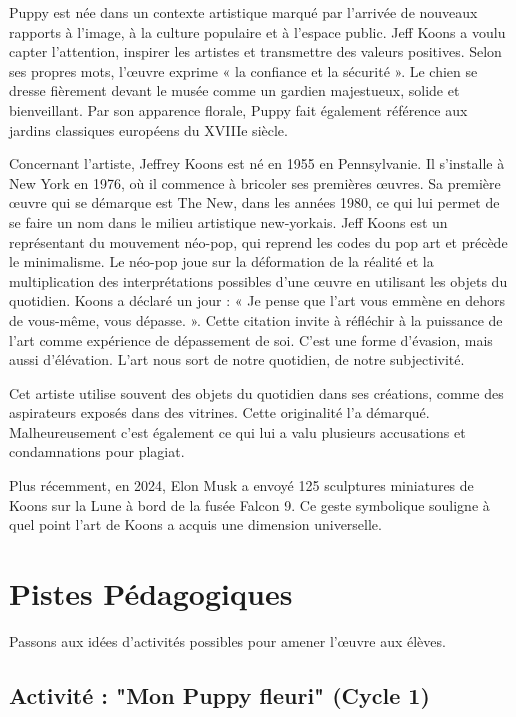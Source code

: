 \documentclass[12pt]{article}
\begin{document}
Puppy est née dans un contexte artistique marqué par l’arrivée de nouveaux rapports à l’image, à la culture populaire et à l’espace public.
Jeff Koons a voulu capter l’attention, inspirer les artistes et transmettre des valeurs positives. Selon ses propres mots, l’œuvre exprime « la confiance et la sécurité ». Le chien se dresse fièrement devant le musée comme un gardien majestueux, solide et bienveillant. Par son apparence florale, Puppy fait également référence aux jardins classiques européens du XVIIIe siècle.

Concernant l’artiste, Jeffrey Koons est né en 1955 en Pennsylvanie. Il s’installe à New York en 1976, où il commence à bricoler ses premières œuvres. Sa première œuvre qui se démarque est The New, dans les années 1980, ce qui lui permet de se faire un nom dans le milieu artistique new-yorkais. 
Jeff Koons est un représentant du mouvement néo-pop, qui reprend les codes du pop art et précède le minimalisme. 
Le néo-pop joue sur la déformation de la réalité et la multiplication des interprétations possibles d’une œuvre en utilisant les objets du quotidien.
Koons a déclaré un jour : « Je pense que l’art vous emmène en dehors de vous-même, vous dépasse. ». Cette citation invite à réfléchir à la puissance de l’art comme expérience de dépassement de soi. C’est une forme d’évasion, mais aussi d’élévation. L’art nous sort de notre quotidien, de notre subjectivité.

Cet artiste utilise souvent des objets du quotidien dans ses créations, comme des aspirateurs exposés dans des vitrines. Cette originalité l’a démarqué. Malheureusement c’est également ce qui lui a valu plusieurs accusations et condamnations pour plagiat. 

Plus récemment, en 2024, Elon Musk a envoyé 125 sculptures miniatures de Koons sur la Lune à bord de la fusée Falcon 9. Ce geste symbolique souligne à quel point l’art de Koons a acquis une dimension universelle.


\section{Pistes Pédagogiques}

Passons aux idées d’activités possibles pour amener l’œuvre aux élèves.

\subsection*{Activité : "Mon Puppy fleuri" (Cycle 1)}
\end{document}
